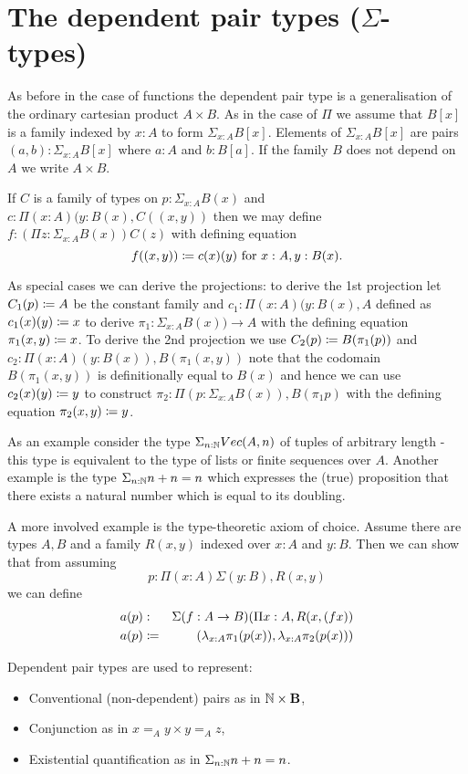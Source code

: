 {\section{The dependent pair types ($\Sigma$-types)}

As before in the case of functions the dependent pair type is a
generalisation of the ordinary cartesian product $A \times B$. 
As in the case of $\Pi$ we assume that $B[x]$ is a family indexed by
$x:A$ to form $\Sigma_{x:A}B[x]$. Elements of $\Sigma_{x:A}B[x]$ are
pairs $(a,b) : \Sigma_{x:A}B[x]$ where $a:A$ and $b:B[a]$. If the
family $B$ does not depend on $A$ we write $A \times B$.

If $C$ is a family of types on $p:\Sigma_{x:A}B(x)$ and 
$c:\Pi (x:A)(y:B(x),C((x,y))$ then we may define 
$f:(\Pi z:\Sigma_{x:A}B(x))C(z)$ with defining equation
  \[f((x,y))\coloneqq c(x)(y)\mbox{ for } x:A,y:B(x).\]

As special cases we can derive the projections: to derive the 1st
projection let $C_1(p) \coloneqq A$ be the constant family and $c_1 : \Pi (x:A)(y:B(x),A$
defined as $c_1(x)(y) \coloneqq x$ to derive $\pi_1 : \Sigma_{x:A}B(x)) \to A$
with the defining equation $\pi_1 (x,y) \coloneqq x$. To derive the 2nd
projection we use $C_2(p) \coloneqq B (\pi_1(p))$ and $c_2 : \Pi
(x:A)(y:B(x)),B(\pi_1(x,y))$ note that the codomain $B(\pi_1(x,y))$ is
definitionally equal to $B(x)$ and hence we can use $c_2(x)(y) \coloneqq
y$ to construct $\pi_2 : \Pi(p : \Sigma_{x:A}{B(x)}),B(\pi_1 p)$ with
the defining equation $\pi_2(x,y) \coloneqq y$.

As an example consider the type $\Sigma_{n:\mathbb{N}}Vec(A,n)$ of tuples of
arbitrary length - this type is equivalent to the type of lists or
finite sequences over $A$. Another example is the type
$\Sigma_{n:\mathbb{N}}n+n = n$ which expresses the (true) proposition that
there exists a natural number which is equal to its doubling.

A more involved example is the type-theoretic axiom of choice. Assume
there are types $A,B$ and a family $R(x,y)$ indexed over $x:A$ and
$y:B$. Then we can show that from assuming 
\[p : \Pi(x:A)\Sigma(y :B),R(x,y)\] 
we can define 
\begin{eqnarray*}
a(p) & : & \Sigma(f : A \to B)(\Pi x:A,R(x,(fx)) \\
a(p) & \coloneqq & (\lambda_{x:A} \pi_1(p(x)),\lambda_{x:A} \pi_2(p(x)))
\end{eqnarray*}

Dependent pair types are used to represent:
\begin{itemize}
\item Conventional (non-dependent) pairs as in $\mathbb{N} \times {\bf B}$,
\item Conjunction as in $x =_A y \times y =_A z$,
\item Existential quantification as in $\Sigma_{n:\mathbb{N}}n+n = n$.
\end{itemize}

}
